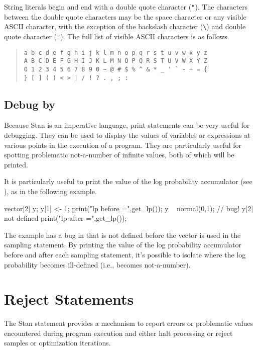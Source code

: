 String literals begin and end with a double quote character
(\Verb|"|).  The characters between the double quote characters may be
the space character or any visible ASCII character, with the exception
of the backslash character (\Verb|\|) and double quote character
(\Verb|"|).  The full list of visible ASCII characters is as follows.
%
\begin{quote}
\begin{Verbatim}
a b c d e f g h i j k l m n o p q r s t u v w x y z
A B C D E F G H I J K L M N O P Q R S T U V W X Y Z
0 1 2 3 4 5 6 7 8 9 0 ~ @ # $ % ^ & * _ ' ` - + = {
} [ ] ( ) < > | / ! ? . , ; :
\end{Verbatim}
\end{quote}

\subsection{Debug by }

Because Stan is an imperative language, print statements can be very
useful for debugging.  They can be used to display the values of
variables or expressions at various points in the execution of a
program.  They are particularly useful for spotting problematic
not-a-number of infinite values, both of which will be printed.

It is particularly useful to print the value of the log probability
accumulator (see ), as in the following example.
%
\begin{stancode}
vector[2] y;
y[1] <- 1;
print("lp before =",get_lp());
y ~ normal(0,1); // bug!  y[2] not defined
print("lp after =",get_lp());
\end{stancode}
%
The example has a bug in that  is not defined before the
vector  is used in the sampling statement.  By printing the
value of the log probability accumulator before and after each
sampling statement, it's possible to isolate where the log probability
becomes ill-defined (i.e., becomes not-a-number).

\section{Reject Statements}\label{reject-statements.section}

The Stan  statement provides a mechanism to
report errors or problematic values encountered during program
execution and either halt processing or reject samples or optimization
iterations.

